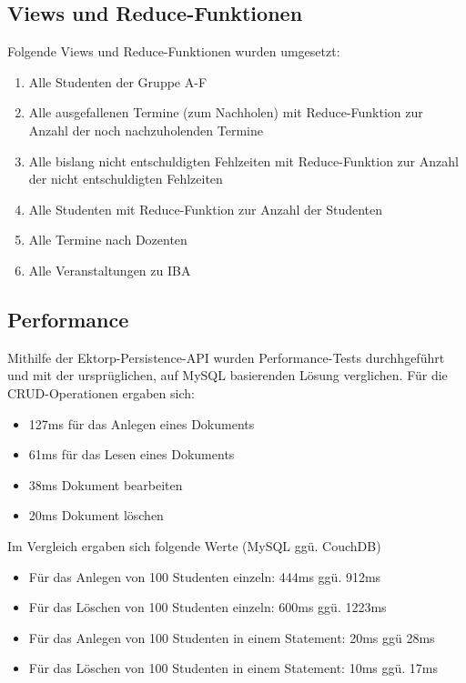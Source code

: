 \vspace{18pt}

\subsection{Views und Reduce-Funktionen}
Folgende Views und Reduce-Funktionen wurden umgesetzt:
\begin{enumerate}
\item  Alle Studenten der Gruppe A-F
\item Alle ausgefallenen Termine (zum Nachholen)  mit Reduce-Funktion zur Anzahl der noch nachzuholenden Termine
\item Alle bislang nicht entschuldigten Fehlzeiten mit Reduce-Funktion zur Anzahl der nicht entschuldigten Fehlzeiten
\item Alle Studenten  mit Reduce-Funktion zur Anzahl der Studenten
\item Alle Termine nach Dozenten
\item Alle Veranstaltungen zu IBA
\end{enumerate}

\vspace{18pt}

\subsection{Performance}
Mithilfe der Ektorp-Persistence-API wurden Performance-Tests durchhgeführt und mit der ursprüglichen, auf MySQL basierenden Lösung verglichen.
Für die CRUD-Operationen ergaben sich:
\begin{itemize}
    \item  127ms für das Anlegen eines Dokuments
    \item 61ms für das Lesen eines Dokuments
    \item 38ms Dokument bearbeiten
    \item 20ms Dokument löschen
\end{itemize}
Im Vergleich ergaben sich folgende Werte (MySQL ggü. CouchDB)
\begin{itemize}
    \item   Für das Anlegen von 100 Studenten einzeln: 444ms ggü. 912ms
    \item Für das Löschen von 100 Studenten einzeln: 600ms ggü. 1223ms
    \item Für das Anlegen von 100 Studenten in einem Statement: 20ms ggü 28ms
    \item Für das Löschen von 100 Studenten in einem Statement: 10ms ggü. 17ms
\end{itemize}

